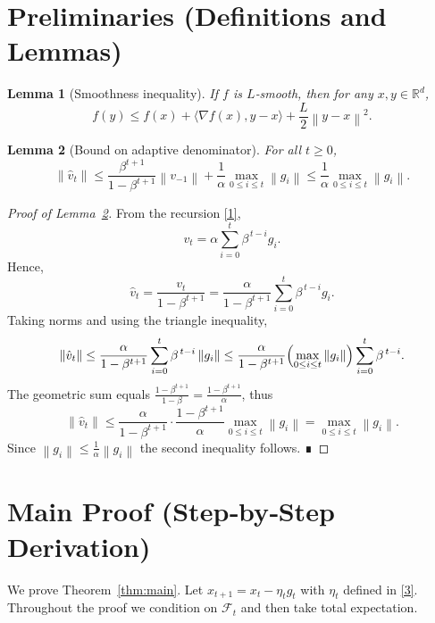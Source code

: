 \documentclass{article}
\newtheorem{lemma}{Lemma}
\newcommand{\norm}[1]{\left\|#1\right\|}
\begin{document}
\section*{Preliminaries (Definitions and Lemmas)}
\begin{lemma}[Smoothness inequality]\label{lem:smooth}
If $f$ is $L$‑smooth, then for any $x,y\in\mathbb{R}^d$,
\[
f(y)\le f(x)+\langle\nabla f(x),y-x\rangle+\frac{L}{2}\norm{y-x}^2 .
\]
\end{lemma}
\begin{lemma}[Bound on adaptive denominator]\label{lem:denom}
For all $t\ge0$,
\[
\norm{\hat v_t}\le \frac{\beta^{t+1}}{1-\beta^{t+1}}\norm{v_{-1}}+\frac{1}{\alpha}\max_{0\le i\le t}\norm{g_i}
\le \frac{1}{\alpha}\max_{0\le i\le t}\norm{g_i}.
\]
\end{lemma}
\begin{proof}[Proof of Lemma~\ref{lem:denom}]
From the recursion \eqref{1},
\[
v_t=\alpha\sum_{i=0}^{t}\beta^{\,t-i}g_i .
\]
Hence,
\[
\hat v_t=\frac{v_t}{1-\beta^{t+1}}
      =\frac{\alpha}{1-\beta^{t+1}}\sum_{i=0}^{t}\beta^{\,t-i}g_i .
\]
Taking norms and using the triangle inequality,
\[
\norm{\hat v_t}\le
\frac{\alpha}{1-\beta^{t+1}}\sum_{i=0}^{t}\beta^{\,t-i}\norm{g_i}
\le\frac{\alpha}{1-\beta^{t+1}}\Bigl(\max_{0\le i\le t}\norm{g_i}\Bigr)\sum_{i=0}^{t}\beta^{\,t-i}.
\]
The geometric sum equals $\frac{1-\beta^{t+1}}{1-\beta}=\frac{1-\beta^{t+1}}{\alpha}$, thus
\[
\norm{\hat v_t}\le\frac{\alpha}{1-\beta^{t+1}}\cdot\frac{1-\beta^{t+1}}{\alpha}
\max_{0\le i\le t}\norm{g_i}
= \max_{0\le i\le t}\norm{g_i}.
\]
Since $\norm{g_i}\le\frac{1}{\alpha}\norm{g_i}$ the second inequality follows. ∎
\end{proof}

\section*{Main Proof (Step‑by‑Step Derivation)}
We prove Theorem~\ref{thm:main}. Let $x_{t+1}=x_t-\eta_t g_t$ with $\eta_t$ defined in \eqref{3}. Throughout the proof we condition on $\mathcal{F}_t$ and then take total expectation.
\end{document}

